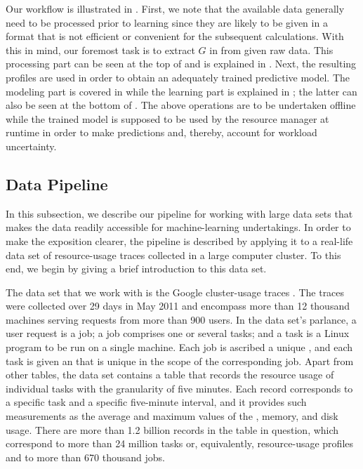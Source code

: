 Our workflow is illustrated in . First, we note that the
available data generally need to be processed prior to learning since they are
likely to be given in a format that is not efficient or convenient for the
subsequent calculations. With this in mind, our foremost task is to extract $G$
in  from given raw data. This processing part can be seen
at the top of  and is explained in .
Next, the resulting profiles are used in order to obtain an adequately trained
predictive model. The modeling part is covered in  while the
learning part is explained in ; the latter can also be
seen at the bottom of . The above operations are to be
undertaken offline while the trained model is supposed to be used by the
resource manager at runtime in order to make predictions and, thereby, account
for workload uncertainty.

\subsection{Data Pipeline}

In this subsection, we describe our pipeline for working with large data sets
that makes the data readily accessible for machine-learning undertakings. In
order to make the exposition clearer, the pipeline is described by applying it
to a real-life data set of resource-usage traces collected in a large computer
cluster. To this end, we begin by giving a brief introduction to this data set.

The data set that we work with is the Google cluster-usage traces
\cite{reiss2011}. The traces were collected over 29 days in May 2011 and
encompass more than 12 thousand machines serving requests from more than 900
users. In the data set's parlance, a user request is a job; a job comprises one
or several tasks; and a task is a Linux program to be run on a single machine.
Each job is ascribed a unique , and each task is given an  that is
unique in the scope of the corresponding job. Apart from other tables, the data
set contains a table that records the resource usage of individual tasks with
the granularity of five minutes. Each record corresponds to a specific task and
a specific five-minute interval, and it provides such measurements as the
average and maximum values of the , memory, and disk usage. There are
more than 1.2 billion records in the table in question, which correspond to more
than 24 million tasks or, equivalently, resource-usage profiles and to more than
670 thousand jobs.

